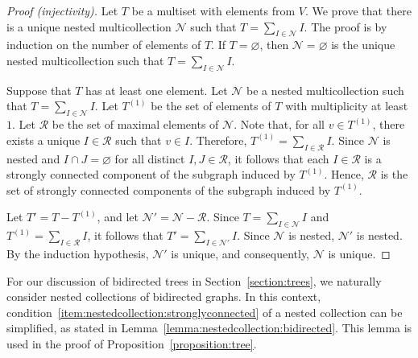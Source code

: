 \documentclass[11pt]{article}
\theoremstyle{definition}
\numberwithin{equation}{section}
\newcommand{\vertices}{V}
\begin{document}
\begin{proof}[Proof (injectivity)]
    Let \(T\) be a multiset with elements from \(\vertices\). We prove that there is a unique nested multicollection \(\mathcal{N}\) such that \(T = \sum_{I \in \mathcal{N}} I\).
    The proof is by induction on the number of elements of \(T\).
    If \(T = \varnothing\), then \(\mathcal{N} = \varnothing\) is the unique nested multicollection such that \(T = \sum_{I \in \mathcal{N}} I\).

    Suppose that \(T\) has at least one element.
    Let \(\mathcal{N}\) be a nested multicollection such that \(T = \sum_{I \in \mathcal{N}} I\).
    Let \(T^{(1)}\) be the set of elements of \(T\) with multiplicity at least \(1\).
    Let \(\mathcal{R}\) be the set of maximal elements of \(\mathcal{N}\).
    Note that, for all \(v \in T^{(1)}\), there exists a unique \(I \in \mathcal{R}\) such that \(v \in I\).
    Therefore, \(T^{(1)} = \sum_{I \in \mathcal{R}} I\).
    Since \(\mathcal{N}\) is nested and \(I \cap J = \varnothing\) for all distinct \(I, J \in \mathcal{R}\), it follows that each \(I \in \mathcal{R}\) is a strongly connected component of the subgraph induced by \(T^{(1)}\).
    Hence, \(\mathcal{R}\) is the set of strongly connected components of the subgraph induced by \(T^{(1)}\).

    Let \(T' = T - T^{(1)}\), and let \(\mathcal{N}' = \mathcal{N} - \mathcal{R}\).
    Since \(T = \sum_{I \in \mathcal{N}} I\) and \(T^{(1)} = \sum_{I \in \mathcal{R}} I\),
    it follows that \(T' = \sum_{I \in \mathcal{N}'} I\).
    Since \(\mathcal{N}\) is nested, \(\mathcal{N}'\) is nested.
    By the induction hypothesis, \(\mathcal{N}'\) is unique, and consequently, \(\mathcal{N}\) is unique.
\end{proof}

For our discussion of bidirected trees in Section~\ref{section:trees},
we naturally consider nested collections of bidirected graphs.
In this context, condition~\ref{item:nestedcollection:stronglyconnected} of a nested collection can be simplified,
as stated in Lemma~\ref{lemma:nestedcollection:bidirected}.
This lemma is used in the proof of Proposition~\ref{proposition:tree}.
\end{document}
